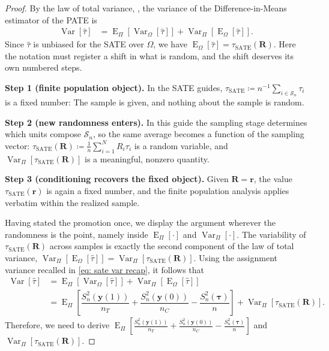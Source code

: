 \documentclass[12pt,leqno]{article}
\theoremstyle{newstyle}
\DeclareMathOperator{\E}{\mathrm{E}}
\DeclareMathOperator{\Var}{\mathrm{Var}}
\newcommand{\bR}{\bm{R}}   \newcommand{\br}{\bm{r}}   %
\newcommand{\EZ}{\E_{\Omega}}    \newcommand{\VarZ}{\Var_{\Omega}}  %
\newcommand{\ER}{\E_{\Pi}}       \newcommand{\VarR}{\Var_{\Pi}}     %
\newcommand{\pov}[1]{\bm{y}(#1)}    %
\newcommand{\tauS}{\tau_{\text{SATE}}}
\newcommand{\tauhat}{\hat{\tau}}
\newcommand{\Ssq}[2][n]{S_{#1}^{2}(#2)}
\begin{document}
\begin{proof}
By the law of total variance, , the variance of the Difference-in-Means estimator of the PATE is
\small
\begin{align*}
\Var\left[\tauhat\right] & = \ER\left[\VarZ\left[\tauhat\right]\right] + \VarR\left[\EZ\left[\tauhat\right]\right].
\end{align*}
\normalsize
Since $\tauhat$ is unbiased for the SATE over $\Omega$, we have $\EZ[\tauhat] = \tauS(\bR)$. Here the notation must register a shift in what is random, and the shift deserves its own numbered steps.

\textbf{Step 1 (finite population object).} In the SATE guides, $\tauS \coloneqq n^{-1}\sum_{i \in \mathcal{S}_n} \tau_i$ is a fixed number: The sample is given, and nothing about the sample is random.

\textbf{Step 2 (new randomness enters).} In this guide the sampling stage determines which units compose $\mathcal{S}_n$, so the same average becomes a function of the sampling vector: $\tauS(\bR) \coloneqq \frac{1}{n}\sum_{i = 1}^N R_i \tau_i$ is a random variable, and $\VarR[\tauS(\bR)]$ is a meaningful, nonzero quantity.

\textbf{Step 3 (conditioning recovers the fixed object).} Given $\bR = \br$, the value $\tauS(\br)$ is again a fixed number, and the finite population analysis applies verbatim within the realized sample.

Having stated the promotion once, we display the argument wherever the randomness is the point, namely inside $\ER[\cdot]$ and $\VarR[\cdot]$. The variability of $\tauS(\bR)$ across samples is exactly the second component of the law of total variance, $\VarR[\EZ[\tauhat]] = \VarR[\tauS(\bR)]$. Using the assignment variance recalled in \eqref{eq: sate var recap}, it follows that
\small
\begin{align*}
\Var\left[\tauhat\right] & = \ER\left[\VarZ\left[\tauhat\right]\right] + \VarR\left[\EZ\left[\tauhat\right]\right] \\
& = \ER\left[\dfrac{\Ssq{\pov{1}}}{n_T} + \dfrac{\Ssq{\pov{0}}}{n_C} - \dfrac{\Ssq{\bm{\tau}}}{n}\right] + \VarR\left[\tauS(\bR)\right].
\end{align*}
\normalsize
Therefore, we need to derive $\ER[\frac{\Ssq{\pov{1}}}{n_T} + \frac{\Ssq{\pov{0}}}{n_C} - \frac{\Ssq{\bm{\tau}}}{n}]$ and $\VarR[\tauS(\bR)]$.


\end{proof}
\end{document}
